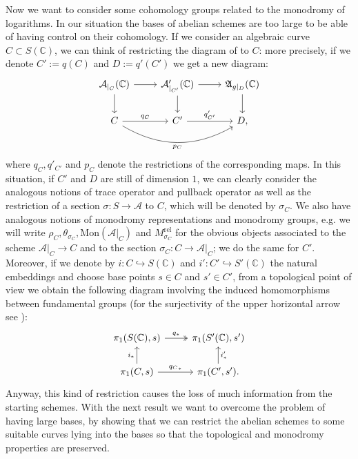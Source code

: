 \documentclass[10 pt,a4paper]{article}
\theoremstyle{plain}
\theoremstyle{definition}
\theoremstyle{named}
\newcommand{\cA}{\mathcal A}
\newcommand{\fA}{\mathfrak A}
\newcommand{\bC}{\mathbb C}
\begin{document}
Now we want to consider some cohomology groups related to the monodromy of logarithms. In our situation the bases of abelian schemes are too large to be able of having control on their cohomology. If we consider an algebraic curve $C \subset S(\mathbb C)$, we can think of restricting the diagram of  to $C$: more precisely, if we denote $C':=q(C)$ and $D:=q'(C')$ we get a new diagram:
\begin{equation}\label{factorSchemeRestr}
\begin{tikzcd}
	\cA_{|_C}(\bC) \arrow{d} \arrow{r} & \cA'_{|_{C'}}(\bC) \arrow{d} \arrow{r} & \fA_{g|_D}(\bC) \arrow{d}\\
	C \arrow{r}{q_C} \arrow[bend right, swap]{rr}{p_C}& C' \arrow{r}{q'_{C'}} & D,
\end{tikzcd}
\end{equation}
where $q_C, q'_{C'}$ and $p_C$ denote the restrictions of the corresponding maps. In this situation, if $C'$ and $D$ are still of dimension $1$, we can clearly consider the analogous notions of trace operator and pullback operator as well as the restriction of a section $\sigma:S \to \cA$ to $C$, which will be denoted by $\sigma_C$. We also have analogous notions of monodromy representations and monodromy groups, e.g. we will write $\rho_C, \theta_{\sigma_C}, \textrm{Mon}(\cA|_C)$ and $M^\textrm{rel}_{\sigma_C}$ for the obvious objects associated to the scheme $\cA|_C \to C$ and to the section $\sigma_C:C\to \cA|_C$; we do the same for $C'$. Moreover, if we denote by $i: C \hookrightarrow S(\bC)$ and $i': C' \hookrightarrow S'(\bC)$ the natural embeddings and choose base points $s \in C$ and $s' \in C'$, from a topological point of view we obtain the following diagram involving the induced homomorphisms between fundamental groups (for the surjectivity of the upper horizontal arrow see ):
\begin{equation}\label{topDiagram}
\begin{tikzcd}
	\pi_1(S(\bC),s) \arrow[two heads]{r}{q_*} & \pi_1(S'(\bC),s')\\
	\pi_1(C,s) \arrow{r}{{q_{C}}_\ast} \arrow{u}{i_*} & \pi_1(C',s') \arrow[swap]{u}{i'_*}.
\end{tikzcd}
\end{equation}
Anyway, this kind of restriction causes the loss of much information from the starting schemes. With the next result we want to overcome the problem of having large bases, by showing that we can restrict the abelian schemes to some suitable curves lying into the bases so that the topological and monodromy properties are preserved.
\end{document}
